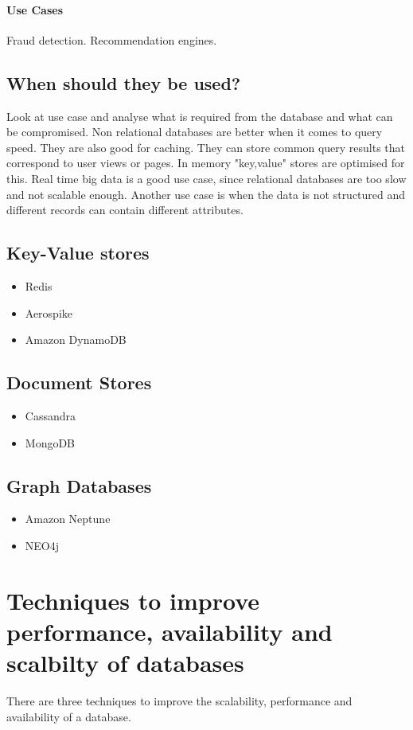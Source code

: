 \documentclass[a4paper, 11pt]{book}
\begin{document}
    \paragraph{Use Cases}
    Fraud detection.
    Recommendation engines.

    \subsection{When should they be used?}
    Look at use case and analyse what is required from the database and what can be compromised.
    Non relational databases are better when it comes to query speed.
    They are also good for caching.
    They can store common query results that correspond to user views or pages.
    In memory "key,value" stores are optimised for this.
    Real time big data is a good use case, since relational databases are too slow and not scalable enough.
    Another use case is when the data is not structured and different records can contain different attributes.

    \subsection{Key-Value stores}
    \begin{itemize}
        \item Redis
        \item Aerospike
        \item Amazon DynamoDB
    \end{itemize}

    \subsection{Document Stores}
    \begin{itemize}
        \item Cassandra
        \item MongoDB
    \end{itemize}

    \subsection{Graph Databases}
    \begin{itemize}
        \item Amazon Neptune
        \item NEO4j
    \end{itemize}


    \section{Techniques to improve performance, availability and scalbilty of databases}
    There are three techniques to improve the scalability, performance and availability of a database.
\end{document}
